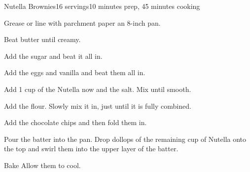 \documentclass[../Cookbook.tex]{subfiles}
\begin{document}
\begin{recipe}{Nutella Brownies}{16 servings}{10 minutes prep, 45 minutes cooking}

	 Grease or line with parchment paper an 8-inch pan.

	Beat butter until creamy.

	Add the sugar and beat it all in.

	Add the eggs and vanilla and beat them all in.

	Add 1 cup of the Nutella now and the salt. Mix until smooth.

	Add the flour. Slowly mix it in, just until it is fully combined.

	Add the chocolate chips and then fold them in.

	Pour the batter into the pan. Drop dollops of the remaining  cup of Nutella onto the top and swirl them into the upper layer of the batter.

	\newstep
	Bake  Allow them to cool.

\end{recipe}
\end{document}
